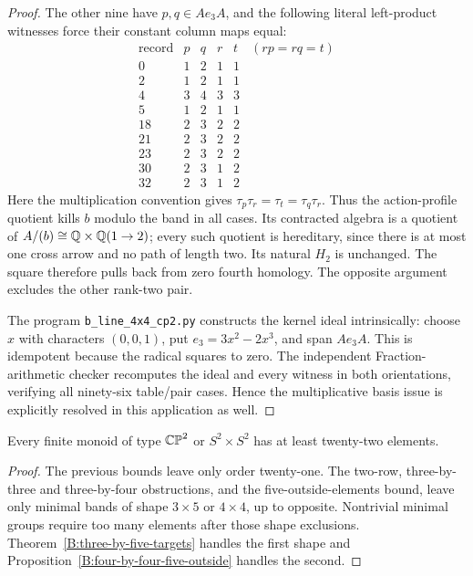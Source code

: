 \begin{proof}
The other nine have $p,q\in Ae_3A$, and the following literal
left-product witnesses force their constant column maps equal:
\[
\begin{array}{c|rrrr}
\text{record}&p&q&r&t\quad(rp=rq=t)\\\hline
0&1&2&1&1\\2&1&2&1&1\\4&3&4&3&3\\5&1&2&1&1\\
18&2&3&2&2\\21&2&3&2&2\\23&2&3&2&2\\
30&2&3&1&2\\32&2&3&1&2
\end{array}
\]
Here the multiplication convention gives
$\tau_p\tau_r=\tau_t=\tau_q\tau_r$.
Thus the action-profile quotient kills $b$ modulo the band in
all cases.  Its contracted algebra is a quotient of
$A/(b)\cong\mathbb Q\times\mathbb Q(1\to2)$; every such quotient is hereditary,
since there is at most one cross arrow and no path of length two.
Its natural $H_2$ is unchanged.  The square
therefore pulls back from zero fourth homology.
The opposite argument excludes the other rank-two pair.

The program \texttt{b\_line\_4x4\_cp2.py} constructs the kernel
ideal intrinsically: choose $x$ with characters $(0,0,1)$, put
$e_3=3x^2-2x^3$, and span $Ae_3A$.  This is idempotent because
the radical squares to zero.  The independent Fraction-arithmetic
checker recomputes the ideal and every witness in both orientations,
verifying all ninety-six table/pair cases.  Hence the multiplicative
basis issue is explicitly resolved in this application as well.
\end{proof}

\begin{corollary}\label{B:fourdim-lower22}
Every finite monoid of type $\mathbb {CP}^2$ or $S^2\times S^2$ has at
least twenty-two elements.
\end{corollary}
\begin{proof}
The previous bounds leave only order twenty-one.
The two-row, three-by-three and three-by-four obstructions, and
the five-outside-elements bound, leave only minimal bands of
shape $3\times5$ or $4\times4$, up to opposite.
Nontrivial minimal groups require too many elements after those
shape exclusions.  Theorem~\ref{B:three-by-five-targets} handles
the first shape and Proposition~\ref{B:four-by-four-five-outside}
handles the second.
\end{proof}
